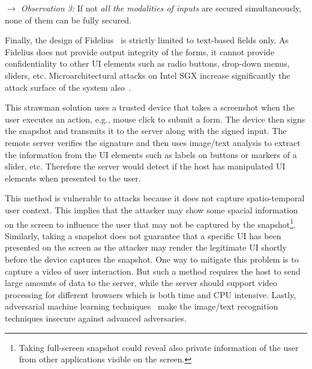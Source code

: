 \noindent\emph{$\rightarrow$ Observation 3:} If not \emph{all the modalities of inputs} are secured simultaneously, none of them can be fully secured.


Finally, the design of Fidelius~\cite{Fidelius} is strictly limited to text-based fields only. As Fidelius does not provide output integrity of the forms, it cannot provide confidentiality to other UI elements such as radio buttons, drop-down menus, sliders, etc.
Microarchitectural attacks on Intel SGX increase significantly the attack surface of the system also~\cite{van2018foreshadow}.





 This strawman solution uses a trusted device that takes a screenshot when the user executes an action, e.g., mouse click to submit a form. The device then signs the snapshot and transmits it to the server along with the signed input. The remote server verifies the signature and then uses image/text analysis to extract the information from the UI elements such as labels on buttons or markers of a slider, etc. Therefore the server would detect if the host has manipulated UI elements when presented to the user.

This method is vulnerable to attacks because it does not capture spatio-temporal user context. This implies that the attacker may show some spacial information on the screen to influence the user that may not be captured by the snapshot\footnote{Taking full-screen snapshot could reveal also private information of the user from other applications visible on the screen.}. Similarly, taking a snapshot does not guarantee that a specific UI has been presented on the screen as the attacker may render the legitimate UI shortly before the device captures the snapshot.
One way to mitigate this problem is to capture a video of user interaction. But such a method requires the host to send large amounts of data to the server, while the server should support video processing for different browsers which is both time and CPU intensive. 
Lastly, adversarial machine learning techniques~\cite{eykholt2017robust,sitawarin2018rogue} make the image/text recognition techniques insecure against advanced adversaries.


